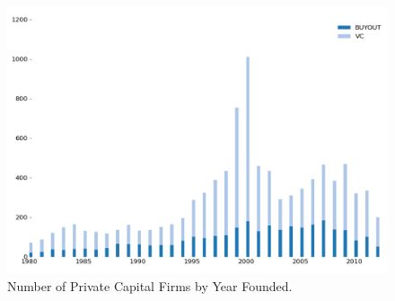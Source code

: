 
\begin{figure}[t]
    \centering
        \includegraphics[width=\widthpcriaa]{./figures/pcrifigurea1} 
        \caption{Number of Private Capital Firms by Year Founded.}\label{fig:pcrifigurea1}
\end{figure}